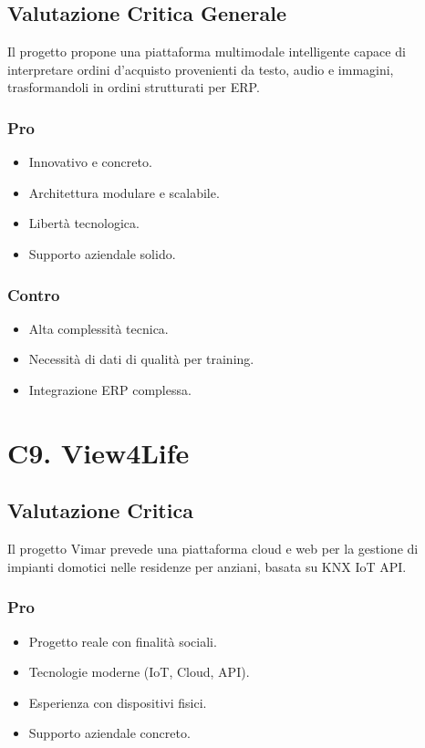 \documentclass[a4paper, 11pt, oneside]{scrartcl} %
\begin{document}
\subsection*{Valutazione Critica Generale}
Il progetto propone una piattaforma multimodale intelligente capace di interpretare ordini d’acquisto provenienti da testo, audio e immagini, trasformandoli in ordini strutturati per ERP.

\subsubsection*{Pro}
\begin{itemize}
    \item Innovativo e concreto.
    \item Architettura modulare e scalabile.
    \item Libertà tecnologica.
    \item Supporto aziendale solido.
\end{itemize}

\subsubsection*{Contro}
\begin{itemize}
    \item Alta complessità tecnica.
    \item Necessità di dati di qualità per training.
    \item Integrazione ERP complessa.
\end{itemize}

\section{C9. View4Life}
\subsection*{Valutazione Critica}
Il progetto Vimar prevede una piattaforma cloud e web per la gestione di impianti domotici nelle residenze per anziani, basata su KNX IoT API.

\subsubsection*{Pro}
\begin{itemize}
    \item Progetto reale con finalità sociali.
    \item Tecnologie moderne (IoT, Cloud, API).
    \item Esperienza con dispositivi fisici.
    \item Supporto aziendale concreto.
\end{itemize}
\end{document}
